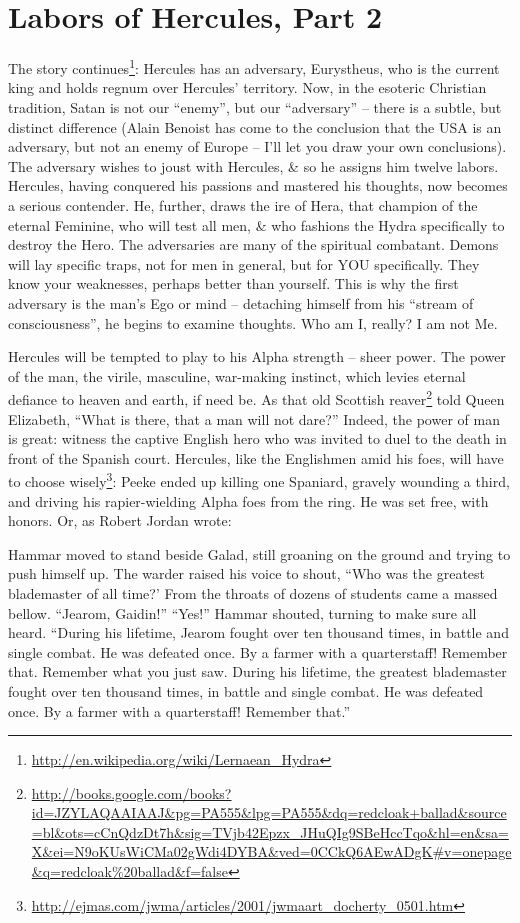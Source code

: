 \section{Labors of Hercules, Part 2}

The story continues\footnote{\url{http://en.wikipedia.org/wiki/Lernaean\_Hydra}}: Hercules has an adversary, Eurystheus, who is the current king and holds regnum over Hercules' territory. Now, in the esoteric Christian tradition, Satan is not our ``enemy'', but our ``adversary'' -- there is a subtle, but distinct difference (Alain Benoist has come to the conclusion that the USA is an adversary, but not an enemy of Europe -- I'll let you draw your own conclusions). The adversary wishes to joust with Hercules, \& so he assigns him twelve labors. Hercules, having conquered his passions and mastered his thoughts, now becomes a serious contender. He, further, draws the ire of Hera, that champion of the eternal Feminine, who will test all men, \& who fashions the Hydra specifically to destroy the Hero. The adversaries are many of the spiritual combatant. Demons will lay specific traps, not for men in general, but for YOU specifically. They know your weaknesses, perhaps better than yourself. This is why the first adversary is the man's Ego or mind -- detaching himself from his ``stream of consciousness'', he begins to examine thoughts. Who am I, really? I am not Me.

Hercules will be tempted to play to his Alpha strength -- sheer power. The power of the man, the virile, masculine, war-making instinct, which levies eternal defiance to heaven and earth, if need be. As that old Scottish reaver\footnote{\url{http://books.google.com/books?id=JZYLAQAAIAAJ&pg=PA555&lpg=PA555&dq=redcloak+ballad&source=bl&ots=cCnQdzDt7h&sig=TVjb42Epzx\_JHuQIg9SBeHccTqo&hl=en&sa=X&ei=N9oKUsWiCMa02gWdi4DYBA&ved=0CCkQ6AEwADgK\#v=onepage&q=redcloak\%20ballad&f=false}} told Queen Elizabeth, ``What is there, that a man will not dare?'' Indeed, the power of man is great: witness the captive English hero who was invited to duel to the death in front of the Spanish court. Hercules, like the Englishmen amid his foes, will have to choose wisely\footnote{\url{http://ejmas.com/jwma/articles/2001/jwmaart\_docherty\_0501.htm}}: Peeke ended up killing one Spaniard, gravely wounding a third, and driving his rapier-wielding Alpha foes from the ring. He was set free, with honors. Or, as Robert Jordan wrote:

\begin{quotex}
Hammar moved to stand beside Galad, still groaning on the ground and trying to push himself up. The warder raised his voice to shout, ``Who was the greatest blademaster of all time?' From the throats of dozens of students came a massed bellow. ``Jearom, Gaidin!'' ``Yes!'' Hammar shouted, turning to make sure all heard. ``During his lifetime, Jearom fought over ten thousand times, in battle and single combat. He was defeated once. By a farmer with a quarterstaff! Remember that. Remember what you just saw. During his lifetime, the greatest blademaster fought over ten thousand times, in battle and single combat. He was defeated once. By a farmer with a quarterstaff! Remember that.''
\end{quotex}


